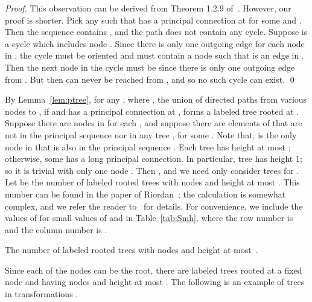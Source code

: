 \documentclass{llncs}
\begin{document}
\begin{proof} 
This observation can be derived from Theorem 1.2.9 of~\cite{GaMa09}. However, our proof is shorter. 
Pick any  such that  has a principal connection at  for some  and . Then the sequence  contains , and the path  does not contain any cycle. Suppose  is a cycle which includes node 
. 
Since there is only one outgoing edge for each node in , the cycle  must be oriented and must contain a node  such that  is an edge in .
Then the next node in the cycle must be  since there is only one outgoing edge from . But then   can never be reached from , and so no such cycle can exist. \qed
\end{proof}


By Lemma~\ref{lem:ptree}, for any , where , the union of directed paths from various nodes  to , if  and  has a principal connection at , forms a labeled tree  rooted at . Suppose there are  nodes in  for each , and suppose there are  elements of  that are not in the principal sequence  nor in any tree , for some . Note that,  is the only node in  that is also in the principal sequence . Each tree  has height at most ; otherwise, some  has a long principal connection. In particular, tree  has height 1; so it is trivial with only one node . Then , and we need only consider trees  for . Let  be the number of labeled rooted trees with  nodes and height at most . This number can be found in the paper of Riordan~\cite{Rio60}; the calculation is somewhat complex, and we refer the reader to~\cite{Rio60} for details. For convenience, we include the values of  for small values of  and  in Table~\ref{tab:Smh}, where the row number is  and the column number is . 


\begin{table}[ht]
\caption{The number  of labeled rooted trees with  nodes and height at most~.}
\label{tab:Smh}
\begin{center}

\end{center}
\label{table0}
\end{table}

Since each of the  nodes can be the root, there are  labeled trees rooted at a fixed node and having  nodes and height at most . The following is an example of trees  in transformations . 
\end{document}
